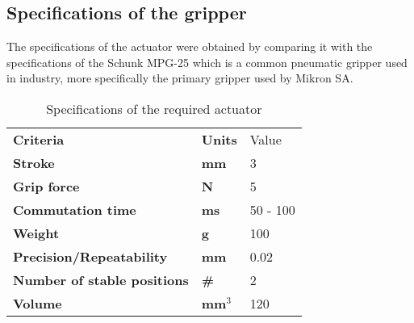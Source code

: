 \subsection{Specifications of the gripper}\label{subsec:specifications}
The specifications of the actuator were obtained by comparing it with the specifications of the Schunk MPG-25 which is a common pneumatic gripper used in industry, more specifically the primary gripper used by Mikron SA.

\begin{table}[H]%
  \centering
  \footnotesize
  \caption{Specifications of the required actuator}
  \label{tab:specs}
  \begin{tabu} to 0.5
      Criteria & Units & Value\\
      Stroke & mm & 3\\
      Grip force & N & 5\\
      Commutation time & ms & 50 - 100\\
      Weight & g & 100\\
      Precision/Repeatability & mm & 0.02\\
      Number of stable positions & \# & 2\\
      Volume & mm$^3$ & 120 \\
  \end{tabu}
\end{table}

